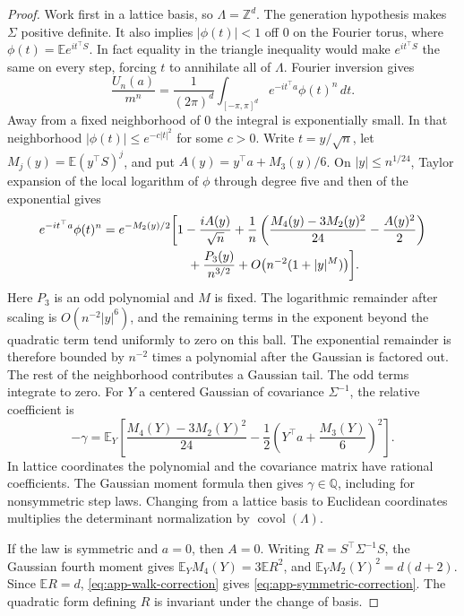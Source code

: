 \documentclass[11pt,reqno,a4paper]{amsart}
\theoremstyle{remark}
\begin{document}
\begin{proof}
Work first in a lattice basis, so \(\Lambda=\mathbb Z^d\). The
generation hypothesis makes \(\Sigma\) positive definite. It also
implies \(|\phi(t)|<1\) off \(0\) on the Fourier torus, where
\(\phi(t)=\mathbb E e^{it^\top S}\). In fact equality in the triangle
inequality would make \(e^{it^\top S}\) the same on every step, forcing
\(t\) to annihilate all of \(\Lambda\). Fourier inversion gives
\[
 \frac{U_n(a)}{m^n}
 =\frac1{(2\pi)^d}\int_{[-\pi,\pi]^d}e^{-it^\top a}\phi(t)^n\,dt .
\]
Away from a fixed neighborhood of \(0\) the integral is exponentially
small. In that neighborhood \(|\phi(t)|\le e^{-c|t|^2}\) for some
\(c>0\). Write \(t=y/\sqrt n\), let \(M_j(y)=\mathbb E(y^\top S)^j\),
and put \(A(y)=y^\top a+M_3(y)/6\). On \(|y|\le n^{1/24}\), Taylor
expansion of the local logarithm of \(\phi\) through degree five and
then of the exponential gives
\begin{align*}
 e^{-it^\top a}\phi(t)^n
 &=e^{-M_2(y)/2}\biggl[1-\frac{iA(y)}{\sqrt n}
 +\frac1n\left(\frac{M_4(y)-3M_2(y)^2}{24}
                -\frac{A(y)^2}{2}\right)\\
 &\hspace{24mm}
 +\frac{P_3(y)}{n^{3/2}}
 +O\!\left(n^{-2}(1+|y|^{M})\right)\biggr].
\end{align*}
Here \(P_3\) is an odd polynomial and \(M\) is fixed. The logarithmic
remainder after scaling is \(O(n^{-2}|y|^6)\), and the remaining
terms in the exponent beyond the quadratic term tend uniformly to
zero on this ball. The exponential remainder is therefore bounded
by \(n^{-2}\) times a polynomial after the Gaussian is factored out.
The rest of the neighborhood contributes a Gaussian tail. The odd
terms integrate to zero. For \(Y\) a centered Gaussian of covariance
\(\Sigma^{-1}\), the relative coefficient is
\begin{equation}\label{eq:app-walk-correction}
 -\gamma=\mathbb E_Y\left[
     \frac{M_4(Y)-3M_2(Y)^2}{24}
       -\frac12\left(Y^\top a+\frac{M_3(Y)}6\right)^2
                      \right].
\end{equation}
In lattice coordinates the polynomial and the covariance matrix
have rational coefficients. The Gaussian moment formula then gives
\(\gamma\in\mathbb Q\), including for nonsymmetric step laws.
Changing from a lattice basis to Euclidean coordinates multiplies the
determinant normalization by \(\operatorname{covol}(\Lambda)\).

If the law is symmetric and \(a=0\), then \(A=0\).
Writing \(R=S^\top\Sigma^{-1}S\), the Gaussian fourth moment gives
\(\mathbb E_Y M_4(Y)=3\mathbb E R^2\), and
\(\mathbb E_Y M_2(Y)^2=d(d+2)\). Since \(\mathbb ER=d\),
\eqref{eq:app-walk-correction} gives \eqref{eq:app-symmetric-correction}.
The quadratic form defining \(R\) is invariant under the change
of basis.
\end{proof}
\end{document}
